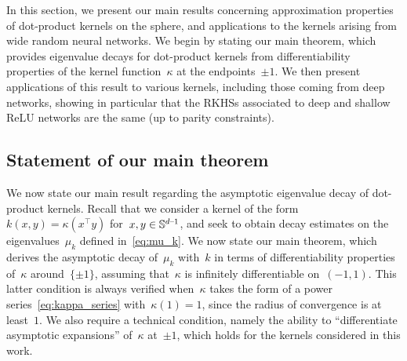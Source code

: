 

In this section, we present our main results concerning approximation properties of dot-product kernels on the sphere, and applications to the kernels arising from wide random neural networks.
We begin by stating our main theorem, which provides eigenvalue decays for dot-product kernels from differentiability properties of the kernel function~$\kappa$ at the endpoints~$\pm 1$.
We then present applications of this result to various kernels, including those coming from deep networks, showing in particular that the RKHSs associated to deep and shallow ReLU networks are the same (up to parity constraints).

\subsection{Statement of our main theorem}

We now state our main result regarding the asymptotic eigenvalue decay of dot-product kernels.
Recall that we consider a kernel of the form~$k(x, y) = \kappa(x^\top y)$ for~$x, y \in {\mathbb S}^{{d\text{--}1}}$,
and seek to obtain decay estimates on the eigenvalues~$\mu_k$ defined in~\eqref{eq:mu_k}.
We now state our main theorem, which derives the asymptotic decay of~$\mu_k$ with~$k$ in terms of differentiability properties of~$\kappa$ around~$\{\pm 1\}$, assuming that~$\kappa$ is infinitely differentiable on~$(-1,1)$. This latter condition is always verified when~$\kappa$ takes the form of a power series~\eqref{eq:kappa_series} with~$\kappa(1) = 1$, since the radius of convergence is at least~$1$.
We also require a technical condition, namely the ability to ``differentiate asymptotic expansions'' of~$\kappa$ at~$\pm 1$, which holds for the kernels considered in this work.

